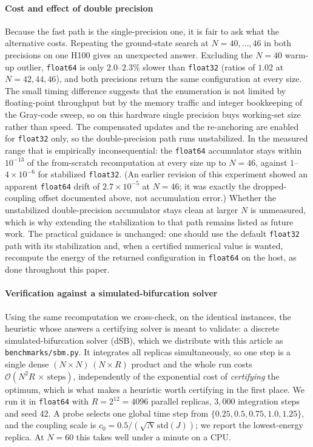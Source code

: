 \documentclass[12pt,a4paper]{elsarticle}
\begin{document}
\paragraph{Cost and effect of double precision}
Because the fast path is the single-precision one, it is fair to ask what the alternative
costs. Repeating the ground-state search at $N=40,\dots,46$ in both precisions on one H100
gives an unexpected answer. Excluding the $N=40$ warm-up outlier, \texttt{float64} is only
$2.0$--$2.3\%$ slower than \texttt{float32} (ratios of $1.02$ at
$N=42,44,46$), and both precisions return the same configuration at every size. The small timing difference suggests that the enumeration is not limited by floating-point
throughput but by the memory traffic and integer bookkeeping of the Gray-code sweep, so on
this hardware single precision buys working-set size rather than speed.
The compensated updates and the re-anchoring are enabled for \texttt{float32} only, so the
double-precision path runs unstabilized. In the measured range that is empirically
inconsequential: the \texttt{float64} accumulator stays within $10^{-13}$ of the from-scratch
recomputation at every size up to $N=46$, against $1$--$4\times 10^{-6}$ for stabilized
\texttt{float32}. (An earlier revision of this experiment showed an apparent \texttt{float64}
drift of $2.7\times 10^{-5}$ at $N=46$; it was exactly the dropped-coupling offset documented
above, not accumulation error.) Whether the unstabilized double-precision accumulator stays
clean at larger $N$ is unmeasured, which is why extending the stabilization to that path
remains listed as future work. The practical guidance is unchanged: one should use the default
\texttt{float32} path with its stabilization and, when a certified numerical value is wanted,
recompute the energy of the returned configuration in \texttt{float64} on the host, as done
throughout this paper.

\paragraph{Verification against a simulated-bifurcation solver}
Using the same recomputation we cross-check, on the identical instances, the heuristic whose
answers a certifying solver is meant to validate: a discrete simulated-bifurcation solver
(dSB), which we distribute with this article as \texttt{benchmarks/sbm.py}. It integrates all
replicas simultaneously, so one step is a single dense
$(N\!\times\!N)\,(N\!\times\!R)$ product and the whole run costs
$\mathcal{O}(N^{2}R\,\times\,\mathrm{steps})$, independently of the exponential cost of
\emph{certifying} the optimum, which is what makes a heuristic worth certifying in the first
place. We run it in \texttt{float64} with $R=2^{12}=4096$ parallel replicas, $3{,}000$
integration steps and seed 42. A probe selects one global time step from
$\{0.25,0.5,0.75,1.0,1.25\}$, and the coupling scale is
$c_0=0.5/(\sqrt{N}\,\mathrm{std}(J))$; we report the lowest-energy replica. At $N=60$ this
takes well under a minute on a CPU.
\end{document}

